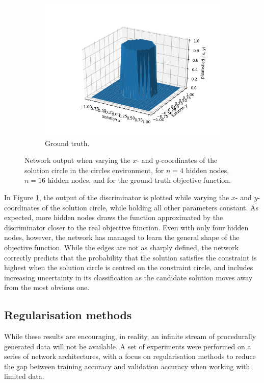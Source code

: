 \documentclass[a4paper]{article}
\begin{document}
\begin{figure}
  \begin{subfigure}[a]{.8\linewidth}
    \includegraphics[width=.8\linewidth]{../../figures/artificial-discriminator-true-objective-function.png}
    \caption{Ground truth.}
  \end{subfigure}
  \caption{
    Network output when varying the $x$- and $y$-coordinates of the solution circle in the circles environment,
    for $n=4$ hidden nodes, $n=16$ hidden nodes, and for the ground truth objective function.
  }
\label{fig:artificialDiscriminator}
\end{figure}

In Figure \ref{fig:artificialDiscriminator}, the output of the discriminator is plotted while varying the $x$- and $y$-coordinates
of the solution circle, while holding all other parameters constant.
As expected, more hidden nodes draws the function approximated by the discriminator closer to the real objective function.
Even with only four hidden nodes, however, the network has managed to learn the general shape of the objective function.
While the edges are not as sharply defined, the network correctly predicts that the probability that the solution satisfies
the constraint is highest when the solution circle is centred on the constraint circle, and includes increasing
uncertainty in its classification as the candidate solution moves away from the most obvious one.

\subsection{Regularisation methods}

While these results are encouraging, in reality, an infinite stream of procedurally generated data will not be available.
A set of experiments were performed on a series of network architectures, with a focus on regularisation methods to
reduce the gap between training accuracy and validation accuracy when working with limited data.
\end{document}
